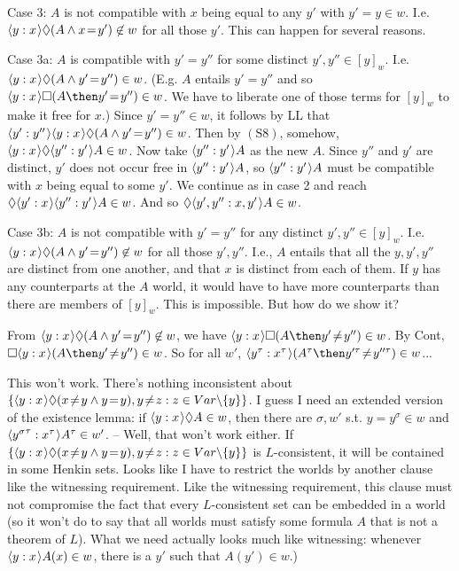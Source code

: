 \documentclass[11pt]{woarticle}
\theoremstyle{break}
\theoremstyle{nonumberplain}
\newcommand{\1}{\;\,|\;\,}
\renewcommand{\t}[1]{\ensuremath{\langle #1  \makebox[.2ex]{}\rangle}}
\newcommand{\T}[1]{\ensuremath{(\mathrm{ #1})}}
\begin{document}
{  Case 3: $A$ is not compatible with $x$ being equal to any $y'$ with
  $y'=y \in w$. I.e. $\t{y:x}\Diamond (A \land x\!=\!y') \not\in w$
  for all those $y'$. This can happen for several reasons.
  
  Case 3a: $A$ is compatible with $y'=y''$ for some distinct $y',y''
  \in [y]_w$. I.e. $\t{y:x}\Diamond (A \land y'\!=\!y'') \in w$. (E.g.
  $A$ entails $y' = y''$ and so $\t{y:x}\Box (A \then y'\!=\!y'') \in
  w$. We have to liberate one of those terms for $[y]_w$ to make it
  free for $x$.) Since $y'\!=\!y'' \in w$, it follows by LL that
  $\t{y':y''}\t{y:x}\Diamond (A \land y'\!=\!y'') \in w$. Then by
  \T{S8}, somehow, $\t{y:x} \Diamond \t{y'':y'} A \in w$. Now take
  $\t{y'':y'}A$ as the new $A$. Since $y''$ and $y'$ are distinct,
  $y'$ does not occur free in $\t{y'':y'}A$, so $\t{y'':y'}A$ must be
  compatible with $x$ being equal to some $y'$. We continue as in case
  2 and reach $\Diamond \t{y':x}\t{y'':y'}A \in w$. And so $\Diamond
  \t{y',y'':x,y'}A \in w$.
  
  Case 3b: $A$ is not compatible with $y'=y''$ for any distinct
  $y',y'' \in [y]_w$. I.e. $\t{y:x}\Diamond (A \land y'\!=\!y'')
  \not\in w$ for all those $y',y''$. I.e., $A$ entails that all the
  $y,y',y''$ are distinct from one another, and that $x$ is distinct
  from each of them. If $y$ has any counterparts at the $A$ world, it
  would have to have more counterparts than there are members of
  $[y]_w$. This is impossible. But how do we show it?
  
  From $\t{y:x}\Diamond (A \land y'\!=\!y'') \not\in w$, we have
  $\t{y:x}\Box (A \then y'\!\not=\!y'') \in w$. By Cont, $\Box
  \t{y:x}(A \then y'\!\not=\!y'') \in w$. So for all $w'$,
  $\t{y^\tau:x^\tau}(A^\tau \then y'^\tau\!\not=\!y''^\tau) \in w$...
  
  This won't work. There's nothing inconsistent about $\{
  \t{y:x}\Diamond (x\!\not=\!y \land y\!=\!y), y\!\not=\!z : z \in Var
  \backslash \{ y \}\}$. I guess I need an extended version of the
  existence lemma: if $\t{y:x}\Diamond A \in w$, then there are
  $\sigma,w'$ s.t. $y\!=\!y^\sigma \in w$ and $\t{{y^\sigma}^\tau:x^\tau}
  A^\tau \in w'$. -- Well, that won't work either. If $\{ \t{y:x}\Diamond
  (x\!\not=\!y \land y\!=\!y), y\!\not=\!z : z \in Var \backslash \{ y
  \}\}$ is $L$-consistent, it will be contained in some Henkin
  sets. Looks like I have to restrict the worlds by another clause
  like the witnessing requirement. Like the witnessing requirement,
  this clause must not compromise the fact that every $L$-consistent
  set can be embedded in a world (so it won't do to say that all
  worlds must satisfy some formula $A$ that is not a theorem of
  $L$). What we need actually looks much like witnessing: whenever
  $\t{y:x}A(x) \in w$, there is a $y'$ such that $A(y') \in w$.)

}
\end{document}
